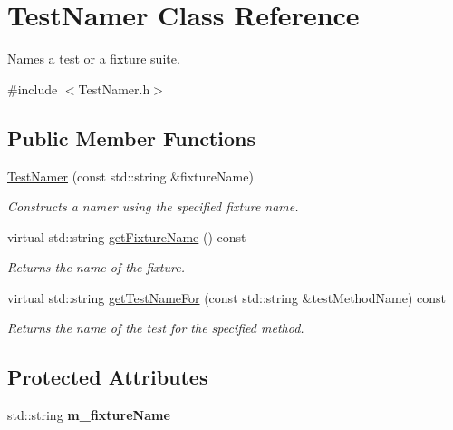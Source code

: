 \hypertarget{class_test_namer}{}\section{Test\+Namer Class Reference}
\label{class_test_namer}


Names a test or a fixture suite.  




{\ttfamily \#include $<$Test\+Namer.\+h$>$}

\subsection*{Public Member Functions}
\begin{DoxyCompactItemize}
\item 
\hyperlink{class_test_namer_ae2c7e349fae02b71dae8e898946bca9e}{Test\+Namer} (const std\+::string \&fixture\+Name)
\begin{DoxyCompactList}\small\item\em Constructs a namer using the specified fixture name. \end{DoxyCompactList}\item 
virtual std\+::string \hyperlink{class_test_namer_a743cc0b154ff4e32d81feccd97917b62}{get\+Fixture\+Name} () const 
\begin{DoxyCompactList}\small\item\em Returns the name of the fixture. \end{DoxyCompactList}\item 
virtual std\+::string \hyperlink{class_test_namer_aa56007426b92b4c34bb2e98548419893}{get\+Test\+Name\+For} (const std\+::string \&test\+Method\+Name) const 
\begin{DoxyCompactList}\small\item\em Returns the name of the test for the specified method. \end{DoxyCompactList}\end{DoxyCompactItemize}
\subsection*{Protected Attributes}
\begin{DoxyCompactItemize}
\item 
std\+::string {\bfseries m\+\_\+fixture\+Name}\hypertarget{class_test_namer_a02f9b6344602d27ef8095a54846e9307}{}\label{class_test_namer_a02f9b6344602d27ef8095a54846e9307}

\end{DoxyCompactItemize}


